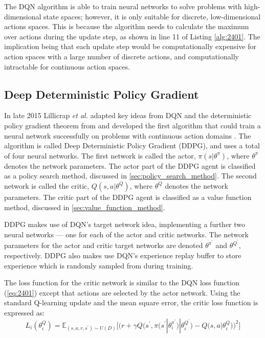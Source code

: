 The DQN algorithm is able to train neural networks to solve problems with high-dimensional state spaces; however, it is only suitable for discrete, low-dimensional actions spaces. This is because the algorithm needs to calculate the maximum over actions during the update step, as shown in line 11 of Listing \ref{alg:2401}. The implication being that each update step would be computationally expensive for action spaces with a large number of discrete actions, and computationally intractable for continuous action spaces.

\subsection{Deep Deterministic Policy Gradient}\label{ssec:deep_deterministic_policy_gradient}
In late 2015 Lillicrap \textit{et al.} adapted key ideas from DQN and the deterministic policy gradient theorem from \cite{Silver2014} and developed the first algorithm that could train a neural network successfully on problems with continuous action domains \cite{Lillicrap2015}. The algorithm is called Deep Deterministic Policy Gradient (DDPG), and uses a total of four neural networks. The first network is called the actor, $\pi(s|\theta^{\pi})$, where $\theta^{\pi}$ denotes the network parameters. The actor part of the DDPG agent is classified as a policy search method, discussed in \textsection \ref{sec:policy_search_method}. The second network is called the critic, $Q(s,a|\theta^{Q})$, where $\theta^Q$ denotes the network parameters. The critic part of the DDPG agent is classified as a value function method, discussed in \textsection \ref{sec:value_function_method}.

DDPG makes use of DQN's target network idea, implementing a further two neural networks --- one for each of the actor and critic networks. The network parameters for the actor and critic target networks are denoted $\theta^{\pi^\prime}$ and $\theta^{Q^\prime}$, respectively. DDPG also makes use DQN's experience replay buffer to store experience which is randomly sampled from during training.

The loss function for the critic network is similar to the DQN loss function (\ref{eq:2401}) except that actions are selected by the actor network. Using the standard Q-learning update and the mean square error, the critic loss function is expressed as:
\begin{equation}
	L_i(\theta^Q_i) = \mathbb{E}_{(s,a,r,s^\prime) \sim U(D)} \bigg[ \bigg( r + \gamma Q \big(s^\prime, \pi\big(s^\prime | \theta^{\pi^\prime}_i \big) | \theta^{Q^\prime}_i \big) - Q \big(s,a | \theta^Q_i \big) \bigg)^2 \bigg]\label{eq:2402}
\end{equation}

